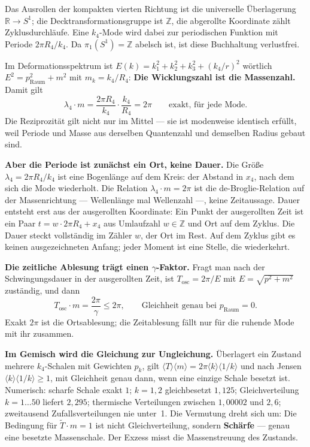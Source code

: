 Das Ausrollen der kompakten vierten Richtung ist die universelle
Überlagerung $\mathbb{R}\to S^1$; die Decktransformationsgruppe ist
$\mathbb{Z}$, die abgerollte Koordinate zählt Zyklusdurchläufe. Eine
$k_4$-Mode wird dabei zur periodischen Funktion mit Periode
$2\pi R_4/k_4$. Da $\pi_1(S^1) = \mathbb{Z}$ abelsch ist, ist diese
Buchhaltung verlustfrei.

Im Deformationsspektrum ist $E(k) = k_1^2+k_2^2+k_3^2+(k_4/r)^2$ wörtlich
$E^2 = p^2_{\mathrm{Raum}}+m^2$ mit $m_k = k_4/R_4$: \textbf{Die
Wicklungszahl ist die Massenzahl.} Damit gilt
\begin{equation}
  \lambda_4\cdot m = \frac{2\pi R_4}{k_4}\cdot\frac{k_4}{R_4} = 2\pi
  \qquad\text{exakt, für jede Mode.}
\end{equation}
Die Reziprozität gilt nicht nur im Mittel --- sie ist modenweise
identisch erfüllt, weil Periode und Masse aus derselben Quantenzahl und
demselben Radius gebaut sind.

\textbf{Aber die Periode ist zunächst ein Ort, keine Dauer.} Die Größe
$\lambda_4 = 2\pi R_4/k_4$ ist eine Bogenlänge auf dem Kreis: der
Abstand in $x_4$, nach dem sich die Mode wiederholt. Die Relation
$\lambda_4\cdot m = 2\pi$ ist die de-Broglie-Relation auf der
Massenrichtung --- Wellenlänge mal Wellenzahl ---, keine Zeitaussage.
Dauer entsteht erst aus der ausgerollten Koordinate: Ein Punkt der
ausgerollten Zeit ist ein Paar $t = w\cdot2\pi R_4+x_4$ aus Umlaufzahl
$w\in\mathbb{Z}$ und Ort auf dem Zyklus. Die Dauer steckt vollständig
im Zähler $w$, der Ort im Rest. Auf dem Zyklus gibt es keinen
ausgezeichneten Anfang; jeder Moment ist eine Stelle, die wiederkehrt.

\textbf{Die zeitliche Ablesung trägt einen $\gamma$-Faktor.} Fragt man
nach der Schwingungsdauer in der ausgerollten Zeit, ist
$T_{\mathrm{osc}} = 2\pi/E$ mit $E = \sqrt{p^2+m^2}$ zuständig, und dann
\begin{equation}
  T_{\mathrm{osc}}\cdot m = \frac{2\pi}{\gamma}\le2\pi,
  \qquad\text{Gleichheit genau bei } p_{\mathrm{Raum}} = 0.
\end{equation}
Exakt $2\pi$ ist die Ortsablesung; die Zeitablesung fällt nur für die
ruhende Mode mit ihr zusammen.

\textbf{Im Gemisch wird die Gleichung zur Ungleichung.} Überlagert ein
Zustand mehrere $k_4$-Schalen mit Gewichten $p_k$, gilt
$\langle T\rangle\langle m\rangle = 2\pi\langle k\rangle\langle1/k\rangle$
und nach Jensen $\langle k\rangle\langle1/k\rangle\ge1$, mit Gleichheit
genau dann, wenn eine einzige Schale besetzt ist. Numerisch: scharfe
Schale exakt $1$; $k = 1,2$ gleichbesetzt $1{,}125$; Gleichverteilung
$k = 1\dots50$ liefert $2{,}295$; thermische Verteilungen zwischen
$1{,}00002$ und $2{,}6$; zweitausend Zufallsverteilungen nie unter~1.
Die Vermutung dreht sich um: Die Bedingung für $\tilde T\cdot m = 1$ ist
nicht Gleichverteilung, sondern \textbf{Schärfe} --- genau eine besetzte
Massenschale. Der Exzess misst die Massenstreuung des Zustands.

